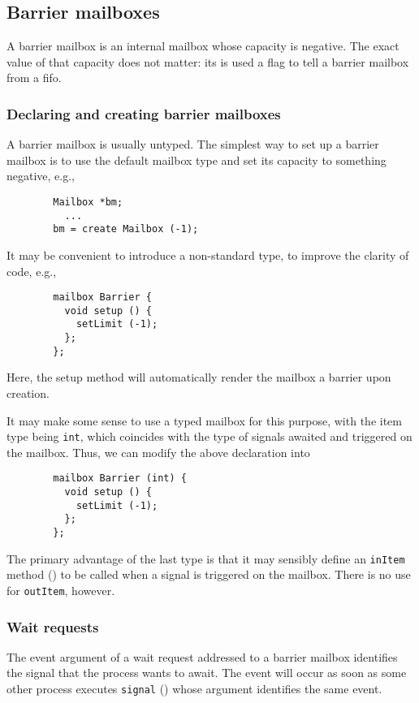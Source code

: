 \subsection{Barrier mailboxes}
\label{rm_mb_ba}

A barrier mailbox is an internal mailbox whose capacity is negative.
The exact value of that capacity does not matter: its is used a flag to tell
a barrier mailbox from a fifo.

\subsubsection{Declaring and creating barrier mailboxes}
\label{rm_mb_ba_dc}

A barrier mailbox is usually untyped.
The simplest way to set up a barrier mailbox is to use the default mailbox
type and set its capacity to something negative, e.g.,
\begin{verbatim}
        Mailbox *bm;
          ...
        bm = create Mailbox (-1);
\end{verbatim}

It may be convenient to introduce a non-standard type, to improve the
clarity of code, e.g.,
\begin{verbatim}
        mailbox Barrier {
          void setup () {
            setLimit (-1);
          };
        };
\end{verbatim}
Here, the setup method will automatically render the mailbox a barrier upon
creation.

It may make some sense to use a typed mailbox for this purpose, with the
item type being {\tt int}, which coincides with the type of signals awaited
and triggered on the mailbox.
Thus, we can modify the above declaration into
\begin{verbatim}
        mailbox Barrier (int) {
          void setup () {
            setLimit (-1);
          };
        };
\end{verbatim}
The primary advantage of the last type is that it may sensibly define
an {\tt inItem} method () to be called when a signal
is triggered on the mailbox.
There is no use for {\tt outItem}, however.

\subsubsection{Wait requests}
\label{rm_mb_ba_wr}

The event argument of a wait request addressed to a barrier mailbox identifies
the signal that the process wants to await.
The event will occur as soon as some other process executes {\tt signal}
() whose argument identifies the same event.

